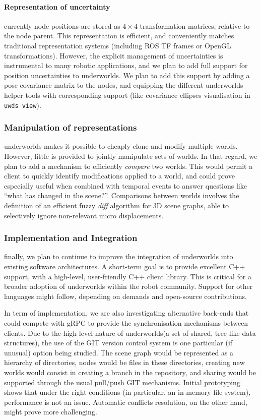 \documentclass[letterpaper, 10pt, conference]{ieeeconf}
\newcommand{\uwds}{{\sc underworlds}\xspace}
\begin{document}
\paragraph*{Representation of uncertainty} currently node positions are 
stored as $4\times4$ transformation matrices, relative to the node parent. This
representation is efficient, and conveniently matches traditional representation
systems (including ROS TF frames or OpenGL transformations). However, the explicit management
of uncertainties is instrumental to many robotic applications, and we plan to
add full support for position uncertainties to \uwds. We plan to add this
support by adding a pose covariance matrix to the nodes, and equipping the
different \uwds helper tools with corresponding support (like covariance
ellipses visualisation in {\tt uwds view}).


\subsubsection{Manipulation of representations} \uwds makes it possible to
cheaply clone and modify multiple worlds. However, little is provided to
jointly manipulate sets of worlds. In that regard, we plan to add a mechanism to
efficiently \emph{compare} two worlds. This would permit a client
to quickly identify modifications applied to a world, and could prove especially
useful when combined with temporal events to answer questions like ``what has
changed in the scene?''. Comparisons between worlds involves the definition of
an efficient fuzzy \emph{diff} algorithm for 3D scene graphs, able to
selectively ignore non-relevant micro displacements.

\subsubsection{Implementation and Integration} finally, we plan to continue to
improve the integration of \uwds into existing software architectures. A
short-term goal is to provide excellent C++ support, with a high-level,
user-friendly C++ client library. This is critical for a broader adoption of \uwds
within the robot community. Support for other languages might follow, depending
on demands and open-source contributions.

In term of implementation, we are also investigating alternative back-ends that
could compete with gRPC to provide the synchronisation mechanisms between
clients. Due to the high-level nature of \uwds (a set of shared, tree-like data
structures), the use of the GIT version control system is one particular (if
unusual) option being studied. The scene graph would be represented as a
hierarchy of directories, nodes would be files in these directories, creating
new worlds would consist in creating a branch in the repository, and sharing
would be supported through the usual pull/push GIT mechanisms. Initial
prototyping shows that under the right conditions (in particular, an in-memory
file system), performance is not an issue. Automatic conflicts resolution, on
the other hand, might prove more challenging.
\end{document}
